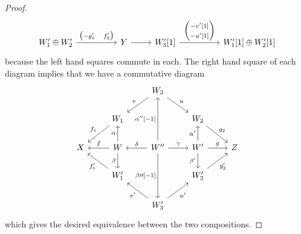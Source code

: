 \documentclass[dissertation.tex]{subfiles}
\begin{document}
\begin{lem}
\begin{proof}
$$\begin{tikzcd}[ampersand replacement=\&]
      \\
      W_1^\prime \oplus W_2^\prime \arrow{rr}{\left(\begin{matrix}-g_1^\prime & f_2^\prime\end{matrix}\right)} \&\& Y \arrow{r} \& W_3^\prime[1] \arrow{rr}{\left(\begin{matrix}-v^\prime[1]\\-u^\prime[1]\end{matrix}\right)} \&\& W_1^\prime[1] \oplus W_2^\prime[1]
    \end{tikzcd}$$
    because the left hand squares commute in each.
    The right hand square of each diagram implies that we have a commutative diagram
    $$\begin{tikzcd}
      & & W_3\arrow[swap]{ld}{v}\arrow{rd}{u}\\
      & W_1\arrow[swap]{ld}{f_1} & & W_2 \arrow{rd}{g_2}\\
      X & W \arrow[swap]{l}{f}\arrow{u}{\alpha}\arrow[swap]{d}{\beta} & W^{\prime\prime}\arrow[swap]{l}{\delta}\arrow{r}{\gamma}\arrow{uu}{\alpha^{\prime\prime}[-1]}\arrow[swap]{dd}{\beta{\prime\prime}[-1]} & W^\prime\arrow{r}{g}\arrow{u}{\alpha^\prime}\arrow[swap]{d}{\beta^\prime} & Z\\
      & W_1^\prime\arrow{lu}{f_1^\prime} & & W_2^\prime \arrow[swap]{ru}{g_2^\prime}\\
      & & W_3^\prime \arrow{lu}{v^\prime}\arrow[swap]{ru}{u^\prime}
    \end{tikzcd}$$
    which gives the desired equivalence between the two compositions.
  \end{proof}
\end{lem}
\end{document}

